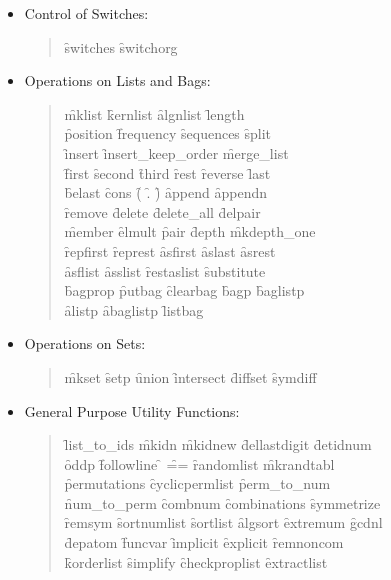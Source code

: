 \begin{itemize}
\item{Control of Switches:}
\begin{quote}
\f{switches} \f{switchorg}
\end{quote}
\item{Operations on Lists and Bags:}
\begin{quote}
\f{mklist} \f{kernlist} \f{algnlist} \f{length} \\
\f{position} \f{frequency} \f{sequences} \f{split} \\
\f{insert} \f{insert\_keep\_order} \f{merge\_list} \\
\f{first} \f{second} \f{third} \f{rest} \f{reverse} \f{last} \\
\f{belast} \f{cons} \f{(} \f{.} \f{)} \f{append} \f{appendn} \\
\f{remove} \f{delete} \f{delete\_all} \f{delpair} \\
\f{member} \f{elmult} \f{pair} \f{depth} \f{mkdepth\_one} \\
\f{repfirst} \f{represt} \f{asfirst} \f{aslast} \f{asrest} \\
\f{asflist} \f{asslist} \f{restaslist} \f{substitute} \\
\f{bagprop} \f{putbag} \f{clearbag} \f{bagp} \f{baglistp} \\
\f{alistp} \f{abaglistp} \f{listbag}
\end{quote}
\item{Operations on Sets:}
\begin{quote}
\f{mkset} \f{setp} \f{union} \f{intersect} \f{diffset} \f{symdiff}
\end{quote}
\item{General Purpose Utility Functions:}
\begin{quote}
\f{list\_to\_ids} \f{mkidn} \f{mkidnew} \f{dellastdigit} \f{detidnum} \\
\f{oddp} \f{followline} \f{} \f{==} \f{randomlist} \f{mkrandtabl} \\
\f{permutations} \f{cyclicpermlist} \f{perm\_to\_num} \\
\f{num\_to\_perm} \f{combnum} \f{combinations} \f{symmetrize} \\
\f{remsym} \f{sortnumlist} \f{sortlist} \f{algsort} \f{extremum} \f{gcdnl} \\
\f{depatom} \f{funcvar} \f{implicit} \f{explicit} \f{remnoncom} \\
\f{korderlist} \f{simplify} \f{checkproplist} \f{extractlist} 
\end{quote}

\end{itemize}
